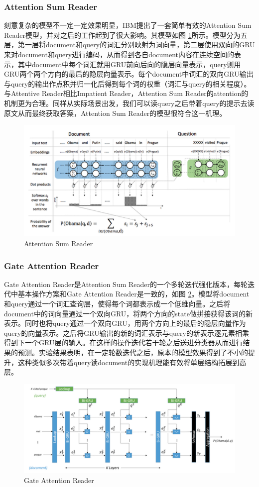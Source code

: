 \documentclass[10pt, titlepage]{article}
\begin{document}
		\subsubsection{Attention Sum Reader}
		刻意复杂的模型不一定一定效果明显，IBM\cite{kadlec2016text}提出了一套简单有效的Attention Sum Reader模型，并对之后的工作起到了很大影响。其模型如图 \ref{fig:AttentionSumReader}所示。模型分为五层，第一层将document和query的词汇分别映射为词向量，第二层使用双向的GRU来对document和query进行编码，从而得到各自document内容在连续空间的表示，其中document中每个词汇就用GRU前向后向的隐层向量表示，query则用GRU两个两个方向的最后的隐层向量表示。每个document中词汇的双向GRU输出与query的输出作点积并归一化后得到每个词的权重（词汇与query的相关程度）。与Attentive Reader相比Impatient Reader，Attention Sum Reader的attention的机制更为合理。同样从实际场景出发，我们可以读query之后带着query的提示去读原文从而最终获取答案，Attention Sum Reader的模型很符合这一机理。
			\begin{figure}[htb]
			\centering
			\includegraphics[width=0.6\columnwidth]{figs/4.png}
			\caption{Attention Sum Reader}
			\label{fig:AttentionSumReader}
			\end{figure}

		\subsubsection{Gate Attention Reader}
		Gate Attention Reader\cite{dhingra2016gated}是Attention Sum Reader的一个多轮迭代强化版本，每轮迭代中基本操作方案和Gate Attention Reader是一致的，如图 \ref{fig:GateAttentionReader}。模型将document和query通过一个词汇查询层，使得每个词都表示成一个低维向量。之后将document中的词向量通过一个双向GRU，将两个方向的state做拼接获得该词的新表示。同时也将query通过一个双向GRU，用两个方向上的最后的隐层向量作为query的向量表示。之后将GRU输出的新的词汇表示与query的新表示逐元素相乘得到下一个GRU层的输入。在这样的操作迭代若干轮之后送进分类器从而进行结果的预测。实验结果表明，在一定轮数迭代之后，原本的模型效果得到了不小的提升，这种类似多次带着query读document的实现机理能有效将单层结构拓展到高层。
			\begin{figure}[htb]
			\centering
			\includegraphics[width=0.6\columnwidth]{figs/5.png}
			\caption{Gate Attention Reader}
			\label{fig:GateAttentionReader}
			\end{figure}
\end{document}
